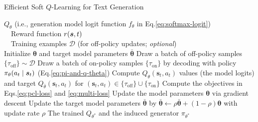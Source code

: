 \begin{algorithm*}[!h]
\caption{Efficient Soft $Q$-Learning for Text Generation}
\label{alg:sql}
\begin{algorithmic}[1]
\REQUIRE $Q_\theta$ (i.e., generation model logit function $f_\theta$ in Eq.\ref{eq:softmax-logit}) \\
\quad\ \  Reward function $r(\bm{s}, t)$ \\
\quad\ \  Training examples $\mathcal{D}$ (for off-policy updates; {\it optional}) \\
\STATE Initialize ${\bm{\theta}}$ and target model parameters ${\bar{\bm{\theta}}}$
\REPEAT
    \STATE Draw a batch of off-policy samples $\{\tau_{\text{off}}\} \sim \mathcal{D}$
    \STATE Draw a batch of on-policy samples $\{\tau_{\text{on}}\}$ by decoding with policy $\pi_\theta(a_t\mid\bm{s}_t)$ (Eq.\ref{eq:pi-and-q-theta})
    \STATE Compute $Q_{\theta} (\bm{s}_t, a_t)$ values (the model logits) and target $Q_{\bar{\theta}} (\bm{s}_t, a_t)$ for $(\bm{s}_t, a_t) \in \{\tau_{\text{off}}\} \cup \{\tau_{\text{on}}\}$
    \STATE Compute the objectives in Eqs.\eqref{eq:pcl-loss} and \eqref{eq:multi-loss}
    \STATE Update the model parameters $\bm{\theta}$ via gradient descent
    \STATE Update the target model parameters $\bar{\bm{\theta}}$ by $\bar{\bm{\theta}} \leftarrow \rho \bar{\bm{\theta}} + ( 1 - \rho) \bm{\theta}$ with update rate $\rho$
\ENSURE The trained $Q_{\theta^*}$ and the induced generator $\pi_{\theta^*}$
\end{algorithmic}
\end{algorithm*}
